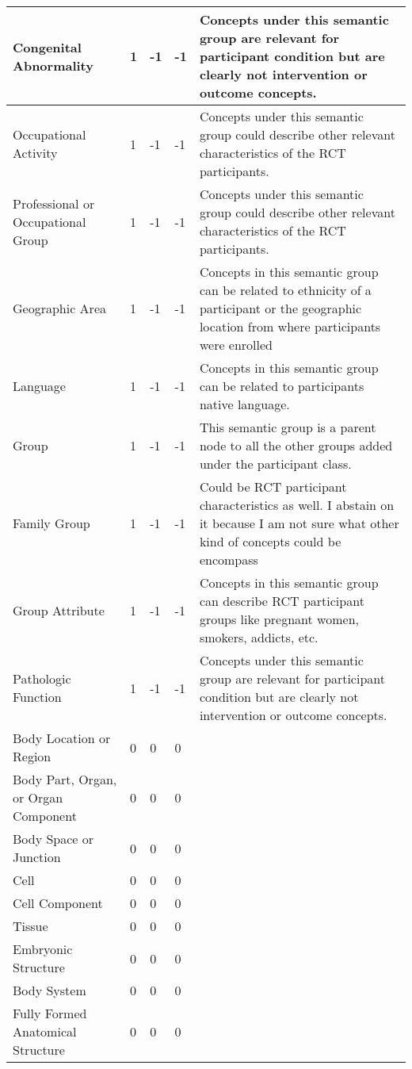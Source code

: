 \documentclass[10.7pt,]{article}
\begin{document}
\begin{longtable}{|l|p{0.3cm}|p{0.3cm}|p{0.3cm}|p{7.9cm}|}
        Congenital Abnormality & 1 & -1 & -1 & Concepts under this semantic group are relevant for participant condition but are clearly not intervention or outcome concepts. \\ \hline
        Occupational Activity & 1 & -1 & -1 & Concepts under this semantic group could describe other relevant characteristics of the RCT participants. \\ \hline
        Professional or Occupational Group & 1 & -1 & -1 & Concepts under this semantic group could describe other relevant characteristics of the RCT participants. \\ \hline
        Geographic Area & 1 & -1 & -1 & Concepts in this semantic group can be related to ethnicity of a participant or the geographic location from where participants were enrolled \\ \hline
        Language & 1 & -1 & -1 & Concepts in this semantic group can be related to participants native language. \\ \hline
        Group & 1 & -1 & -1 & This semantic group is a parent node to all the other groups added under the participant class. \\ \hline
        Family Group & 1 & -1 & -1 & Could be RCT participant characteristics as well. I abstain on it because I am not sure what other kind of concepts could be encompass \\ \hline
        Group Attribute & 1 & -1 & -1 & Concepts in this semantic group can describe RCT participant groups like pregnant women, smokers, addicts, etc. \\ \hline
        Pathologic Function & 1 & -1 & -1 & Concepts under this semantic group are relevant for participant condition but are clearly not intervention or outcome concepts. \\ \hline
        Body Location or Region & 0 & 0 & 0 & ~ \\ \hline
        Body Part, Organ, or Organ Component & 0 & 0 & 0 & ~ \\ \hline
        Body Space or Junction & 0 & 0 & 0 & ~ \\ \hline
        Cell & 0 & 0 & 0 & ~ \\ \hline
        Cell Component & 0 & 0 & 0 & ~ \\ \hline
        Tissue & 0 & 0 & 0 & ~ \\ \hline
        Embryonic Structure & 0 & 0 & 0 & ~ \\ \hline
        Body System & 0 & 0 & 0 & ~ \\ \hline
        Fully Formed Anatomical Structure & 0 & 0 & 0 & ~ \\ \hline

\end{longtable}
\end{document}
